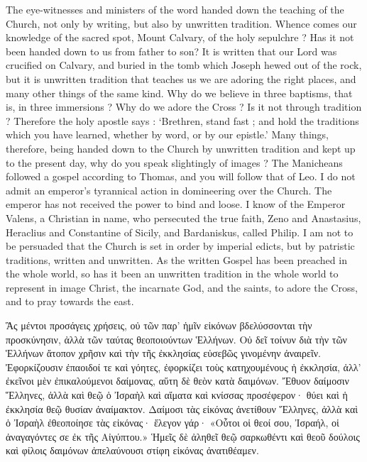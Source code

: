 \documentclass[10pt]{book}
\newcommand{\switchGreek}[1][]{\selectlanguage{polutonikogreek} \switchcolumn*[#1]}
\begin{document}
\begin{paracol}{2}
The eye-witnesses and ministers of the word 
handed down the teaching of the Church, not 
only by writing, but also by unwritten tradition. 
Whence comes our knowledge of the sacred 
spot, Mount Calvary, of the holy sepulchre ? 
Has it not been handed down to us from father 
to son? It is written that our Lord was crucified
on Calvary, and buried in the tomb which 
Joseph hewed out of the rock, but it is unwritten
tradition that teaches us we are adoring 
the right places, and many other things of the 
same kind. Why do we believe in three 
baptisms, that is, in three immersions ? Why 
do we adore the Cross ? Is it not through 
tradition ? Therefore the holy apostle says : 
`Brethren, stand fast ; and hold the traditions 
which you have learned, whether by word, or 
by our epistle.' Many things, therefore, being 
handed down to the Church by unwritten 
tradition and kept up to the present day, why 
do you speak slightingly of images ? The 
Manicheans followed a gospel according to 
Thomas, and you will follow that of Leo. I 
do not admit an emperor's tyrannical action 
in domineering over the Church. The emperor 
has not received the power to bind and loose. 
I know of the Emperor Valens, a Christian in 
name, who persecuted the true faith, Zeno 
and Anastasius, Heraclius and Constantine of 
Sicily, and Bardaniskus, called Philip.
I am not to be persuaded that the 
Church is set in order by imperial edicts, but 
by patristic traditions, written and unwritten. 
As the written Gospel has been preached in 
the whole world, so has it been an unwritten 
tradition in the whole world to represent in 
image Christ, the incarnate God, and the saints, 
to adore the Cross, and to pray towards the east. 

\switchGreek

Ἃς μέντοι προσάγεις χρήσεις, οὐ τῶν παρ’ ἡμῖν εἰκόνων βδελύσσονται τὴν
προσκύνησιν, ἀλλὰ τῶν ταύτας θεοποιούντων Ἑλλήνων. Οὐ δεῖ τοίνυν διὰ τὴν
τῶν Ἑλλήνων ἄτοπον χρῆσιν καὶ τὴν τῆς ἐκκλησίας εὐσεβῶς γινομένην ἀναιρεῖν.
Ἐφορκίζουσιν ἐπαοιδοί τε καὶ γόητες, ἐφορκίζει τοὺς κατηχουμένους ἡ
ἐκκλησία, ἀλλ’ ἐκεῖνοι μὲν ἐπικαλούμενοι δαίμονας, αὕτη δὲ θεὸν κατὰ
δαιμόνων. Ἔθυον δαίμοσιν Ἕλληνες, ἀλλὰ καὶ θεῷ ὁ Ἰσραὴλ καὶ αἵματα καὶ
κνίσσας προσέφερον· θύει καὶ ἡ ἐκκλησία θεῷ θυσίαν ἀναίμακτον. Δαίμοσι τὰς
εἰκόνας ἀνετίθουν Ἕλληνες, ἀλλὰ καὶ ὁ Ἰσραὴλ ἐθεοποίησε τὰς εἰκόνας· ἔλεγον
γάρ· «Οὗτοι οἱ θεοί σου, Ἰσραήλ, οἱ ἀναγαγόντες σε ἐκ τῆς Αἰγύπτου.» Ἡμεῖς
δὲ ἀληθεῖ θεῷ σαρκωθέντι καὶ θεοῦ δούλοις καὶ φίλοις δαιμόνων ἀπελαύνουσι
στίφη εἰκόνας ἀνατιθέαμεν.


\end{paracol}
\end{document}
